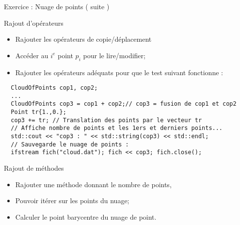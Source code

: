 \documentclass[compress,10pt,aspectratio=169]{beamer}
\begin{document}
  \begin{frame}[fragile]{Exercice : Nuage de points ( suite )}
    \scriptsize
  \begin{exampleblock}{\small Rajout d'opérateurs}
  \begin{multicols}{2}
  \begin{itemize}
  \item Rajouter les opérateurs de copie/déplacement
  \item Accéder au $i^{e}$ point $p_{i}$ pour le lire/modifier;
  \item Rajouter les opérateurs adéquats pour que le test suivant fonctionne :
  \end{itemize}
  \end{multicols}
  \vspace*{-3mm}
  \begin{verbatim}
  CloudOfPoints cop1, cop2;
  ...
  CloudOfPoints cop3 = cop1 + cop2;// cop3 = fusion de cop1 et cop2
  Point tr{1.,0.};
  cop3 += tr; // Translation des points par le vecteur tr
  // Affiche nombre de points et les 1ers et derniers points...
  std::cout << "cop3 : " << std::string(cop3) << std::endl;
  // Sauvegarde le nuage de points :
  ifstream fich("cloud.dat"); fich << cop3; fich.close();
  \end{verbatim}
  \end{exampleblock}
  \vspace*{-4mm}
  \begin{exampleblock}{\small Rajout de méthodes}
  \begin{multicols}{2}
  \vspace*{-3mm}
  \begin{itemize}
  \item Rajouter une méthode donnant le nombre de points, 
  \item Pouvoir itérer sur les points du nuage;
  \item Calculer le point barycentre du nuage de point.
  \end{itemize}
  \end{multicols}
  \end{exampleblock}
    
  \end{frame}
\end{document}
